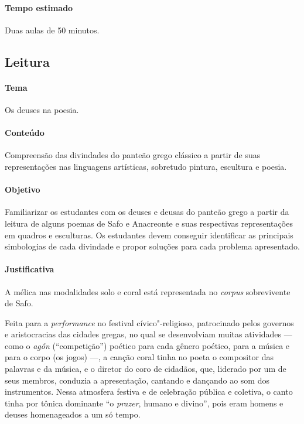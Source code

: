 \documentclass[12pt]{extarticle}
\begin{document}
\paragraph{Tempo estimado} Duas aulas de 50 minutos.



\subsection{Leitura}




\paragraph{Tema} Os deuses na poesia.

\paragraph{Conteúdo} Compreensão das divindades do panteão grego clássico a partir
de suas representações nas linguagens artísticas, sobretudo pintura, escultura e poesia.

\paragraph{Objetivo} Familiarizar os estudantes com os deuses e deusas do panteão grego
a partir da leitura de alguns poemas de Safo e Anacreonte e suas respectivas representações
em quadros e esculturas. Os estudantes devem conseguir identificar as principais simbologias
de cada divindade e propor soluções para cada problema apresentado.

\paragraph{Justificativa} A mélica nas modalidades solo e coral está representada 
no \textit{corpus} sobrevivente de Safo.

Feita para a \textit{performance} no festival cívico"-religioso, patrocinado
pelos governos e aristocracias das cidades gregas, no qual se
desenvolviam muitas atividades --- como o \textit{agṓn} (“competição”) poético
para cada gênero poético, para a música e para o corpo (os jogos) \mbox{---,} 
a canção coral tinha no poeta o compositor das palavras e
da música, e o diretor do coro de cidadãos, que, liderado por um de seus
membros, conduzia a apresentação, cantando e dançando ao som dos instrumentos.
Nessa atmosfera festiva e de celebração pública e coletiva, o canto tinha por
tônica dominante “o \textit{prazer}, humano e divino”, pois eram homens e deuses 
homenageados a um só tempo.
\end{document}

